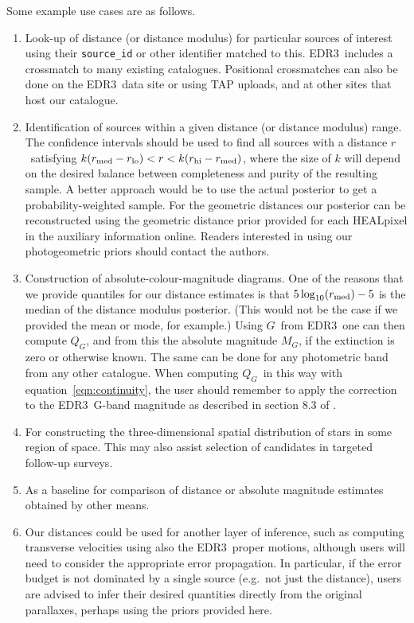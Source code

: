 \documentclass[twocolumn]{aastex62}
\providecommand{\logten}{\ensuremath{\log_{\rm 10}}}
\providecommand{\logten}{\ensuremath{\log_{\rm 10}}}
\providecommand{\release}{EDR3}
\providecommand{\gmag}{\ensuremath{G}}
\providecommand{\MG}{\ensuremath{M_G}}
\providecommand{\QG}{\ensuremath{Q_G}}
\providecommand{\dist}{\ensuremath{r}}
\providecommand{\rlo}{\ensuremath{\dist_{\rm lo}}}
\providecommand{\rhi}{\ensuremath{\dist_{\rm hi}}}
\providecommand{\rmed}{\ensuremath{\dist_{\rm med}}}
\begin{document}
Some example use cases are as follows.
\begin{enumerate}

\item Look-up of distance (or distance modulus) for particular sources of interest using their {\tt source\_id} or other identifier matched to this. \release\ includes a crossmatch to many existing catalogues. Positional crossmatches can also be done on the \release\ data site or using TAP uploads, and at other sites that host our catalogue.

\item Identification of sources within a given distance (or distance modulus) range. The confidence intervals should be used to find all sources with a distance \dist\ satisfying $k(\rmed - \rlo) < \dist < k(\rhi - \rmed)$, where the size of $k$ will depend on the desired balance between completeness and purity of the resulting sample. A better approach would be to use the actual posterior to get a probability-weighted sample. For the geometric distances our posterior can be reconstructed using the geometric distance prior provided for each HEALpixel in the auxiliary information online. Readers interested in using our photogeometric priors should contact the authors.

\item Construction of absolute-colour-magnitude diagrams. One of the reasons that we provide quantiles for our distance estimates is that $5\logten(\rmed)-5$ is the median of the distance modulus posterior. (This would not be the case if we provided the mean or mode, for example.) Using \gmag\ from \release\ one can then compute \QG, and from this the absolute magnitude \MG, if the extinction is zero or otherwise known. The same can be done for any photometric band from any other catalogue. When computing \QG\ in this way with equation~\ref{eqn:continuity}, the user should remember to apply the correction to the \release\ G-band magnitude as described in section 8.3 of \cite{riello_etal_gedr3_photometry}.

\item For constructing the three-dimensional spatial distribution of stars in some region of space. This may also assist selection of candidates in targeted follow-up surveys.

\item As a baseline for comparison of distance or absolute magnitude estimates obtained by other means.

\item Our distances could be used for another layer of inference, such as computing transverse velocities using also the \release\ proper motions, although users will need to consider the appropriate error propagation. In particular, if the error budget is not dominated by a single source (e.g.\ not just the distance),  users are advised to infer their desired quantities directly from the original parallaxes, perhaps using the priors provided here.
\end{enumerate}
\end{document}

